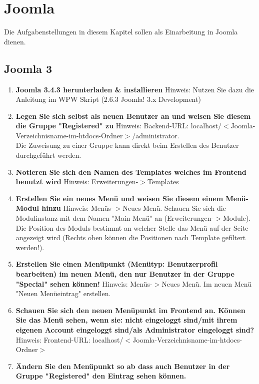 \documentclass[]{article}
\begin{document}
\section{Joomla}
Die Aufgabenstellungen in diesem Kapitel sollen als Einarbeitung in Joomla dienen.
\subsection{Joomla 3}
\begin{enumerate}
\item \textbf{Joomla 3.4.3 herunterladen \& installieren} \newline Hinweis: Nutzen Sie dazu die Anleitung im WPW Skript (2.6.3 Joomla! 3.x Development)
\item \textbf{Legen Sie sich selbst als neuen Benutzer an und weisen Sie diesem die Gruppe "Registered" zu} \newline
Hinweis: Backend-URL: localhost/$ < $Joomla-Verzeichnisname-im-htdocs-Ordner$ > $/administrator. \\
Die Zuweisung zu einer Gruppe kann direkt beim Erstellen des Benutzer durchgeführt werden.
\item \textbf{Notieren Sie sich den Namen des Templates welches im Frontend benutzt wird} \newline
Hinweis: Erweiterungen-$ > $Templates
\item \textbf{Erstellen Sie ein neues Menü und weisen Sie diesem einem Menü-Modul hinzu} \newline
Hinweis: Menüs-$ > $Neues Menü. Schauen Sie sich die Modulinstanz mit dem Namen "Main Menü" an (Erweiterungen-$>$Module). Die Position des Moduls bestimmt an welcher Stelle das Menü auf der Seite angezeigt wird (Rechts oben können die Positionen nach Template gefiltert werden!).
\item \textbf{Erstellen Sie einen Menüpunkt (Menütyp: Benutzerprofil bearbeiten) im neuen Menü, den nur Benutzer in der Gruppe "Special" sehen können!} \newline
Hinweis: Menüs-$ > $Neues Menü. Im neuen Menü "Neuen Menüeintrag" erstellen.
\item \textbf{Schauen Sie sich den neuen Menüpunkt im Frontend an. Können Sie das Menü sehen, wenn sie: nicht eingeloggt sind/mit ihrem eigenen Account eingeloggt sind/als Administrator eingeloggt sind?} \newline
Hinweis: Frontend-URL: localhost/$ < $Joomla-Verzeichnisname-im-htdocs-Ordner$ > $ 
\item \textbf{Ändern Sie den Menüpunkt so ab dass auch Benutzer in der Gruppe "Registered" den Eintrag sehen können.}

\end{enumerate}
\end{document}
